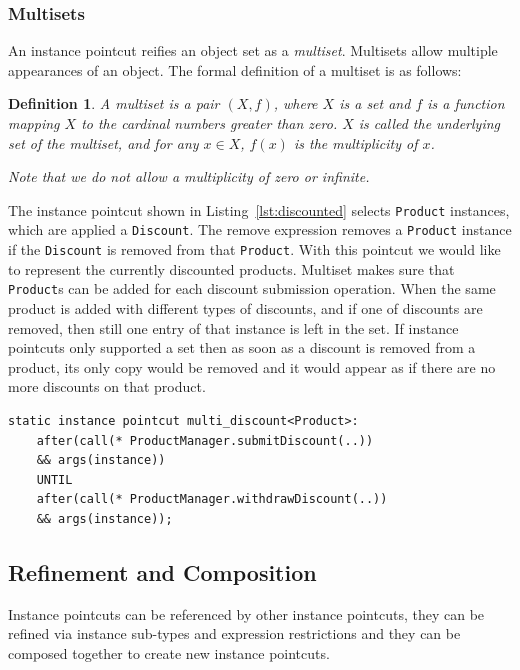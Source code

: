 \documentclass{acm_proc_article-sp}
\newtheorem{mydef}{Definition}
\newcommand{\lstinln}[1]{\lstinline~#1~}
\begin{document}
\subsubsection{Multisets}
An instance pointcut reifies an object set as a \emph{multiset}. Multisets allow multiple appearances of an object. The formal definition of a multiset is as follows:

\begin{mydef}
\label{def:multiset}
A multiset is a pair $(X, f)$, where $X$ is a set and $f$ is a function mapping $X$ to the cardinal numbers greater than zero. $X$ is called the underlying set of the multiset, and for any $x \in X$, $f(x)$ is the multiplicity of $x$.

Note that we do not allow a multiplicity of zero or infinite.
\end{mydef}

The instance pointcut shown in Listing~\ref{lst:discounted} selects \lstinln{Product} instances, which are applied a \lstinln{Discount}. The remove expression removes a \lstinln{Product} instance if the \lstinln{Discount} is removed from that \lstinln{Product}. With this pointcut we would like to represent the currently discounted products. Multiset makes sure that \lstinln{Product}s can be added for each discount submission operation. When the same product is added with different types of discounts, and if one of discounts are removed, then still one entry of that instance is left in the set.  If instance pointcuts only supported a set then as soon as a discount is removed from a product, its only copy would be removed and it would appear as if there are no more discounts on that product. 

\begin{lstlisting}[float=h!, caption={An instance pointcut utilizing multiset property}, label={lst:discounted}]
static instance pointcut multi_discount<Product>: 
	after(call(* ProductManager.submitDiscount(..)) 
	&& args(instance)) 
	UNTIL 
	after(call(* ProductManager.withdrawDiscount(..)) 
	&& args(instance));
\end{lstlisting}


\subsection{Refinement and Composition}

Instance pointcuts can be referenced by other instance pointcuts, they can be refined via instance sub-types and expression restrictions and they can be composed together to create new instance pointcuts. 
\end{document}
